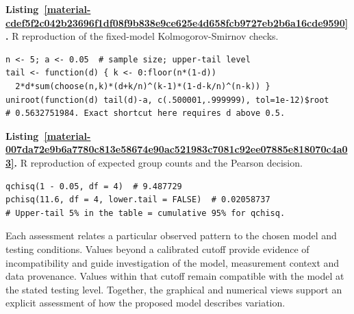 \documentclass[11pt,a4paper]{article}
\newcounter{listing}
\begin{document}

\medskip

\par\medskip
{}
\label{material-cdef5f2c042b23696f1df08f9b838e9ce625e4d658fcb9727eb2b6a16cde9590}
\noindent\textbf{Listing~\ref*{material-cdef5f2c042b23696f1df08f9b838e9ce625e4d658fcb9727eb2b6a16cde9590}.} R reproduction of the fixed-model Kolmogorov-Smirnov checks.\par\nopagebreak
\begin{Verbatim}[fontsize=\footnotesize,breaklines=true,breakanywhere=true]
n <- 5; a <- 0.05  # sample size; upper-tail level
tail <- function(d) { k <- 0:floor(n*(1-d))
  2*d*sum(choose(n,k)*(d+k/n)^(k-1)*(1-d-k/n)^(n-k)) }
uniroot(function(d) tail(d)-a, c(.500001,.999999), tol=1e-12)$root
# 0.5632751984. Exact shortcut here requires d above 0.5.
\end{Verbatim}

\medskip

\par\medskip
{}
\label{material-007da72e9b6a7780c813e58674e90ac521983c7081c92ee07885e818070c4a03}
\noindent\textbf{Listing~\ref*{material-007da72e9b6a7780c813e58674e90ac521983c7081c92ee07885e818070c4a03}.} R reproduction of expected group counts and the Pearson decision.\par\nopagebreak
\begin{Verbatim}[fontsize=\footnotesize,breaklines=true,breakanywhere=true]
qchisq(1 - 0.05, df = 4)  # 9.487729
pchisq(11.6, df = 4, lower.tail = FALSE)  # 0.02058737
# Upper-tail 5% in the table = cumulative 95% for qchisq.
\end{Verbatim}

\medskip

Each assessment relates a particular observed pattern to the chosen model and testing conditions. Values beyond a calibrated cutoff provide evidence of incompatibility and guide investigation of the model, measurement context and data provenance. Values within that cutoff remain compatible with the model at the stated testing level. Together, the graphical and numerical views support an explicit assessment of how the proposed model describes variation.
\end{document}
